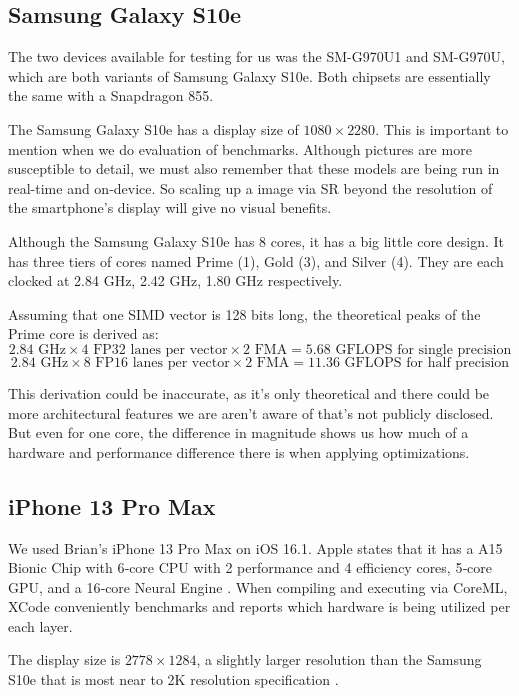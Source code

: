 \documentclass{article}
\begin{document}
\subsection{Samsung Galaxy S10e}
The two devices available for testing for us was the SM-G970U1 and SM-G970U, which are both variants of Samsung Galaxy S10e. Both chipsets are essentially the same with a Snapdragon 855.

The Samsung Galaxy S10e has a display size of $1080 \times 2280$. This is important to mention when we do evaluation of benchmarks. Although pictures are more susceptible to detail, we must also remember that these models are being run in real-time and on-device. So scaling up a image via SR beyond the resolution of the smartphone's display will give no visual benefits. 

Although the Samsung Galaxy S10e has 8 cores, it has a big little core design. It has three tiers of cores named Prime (1), Gold (3), and Silver (4). They are each clocked at 2.84 GHz, 2.42 GHz, 1.80 GHz respectively. 

Assuming that one SIMD vector is 128 bits long, the theoretical peaks of the Prime core is derived as:
$$2.84 \text{ GHz} \times 4 \text{ FP32 lanes per vector} \times 2 \text{ FMA} = 5.68 \text{ GFLOPS for single precision}$$
$$2.84 \text{ GHz} \times 8 \text{ FP16 lanes per vector} \times 2 \text{ FMA} = 11.36 \text{ GFLOPS for half precision}$$

This derivation could be inaccurate, as it's only theoretical and there could be more architectural features we are aren't aware of that's not publicly disclosed. But even for one core, the difference in magnitude shows us how much of a hardware and performance difference there is when applying optimizations.

\subsection{iPhone 13 Pro Max}
We used Brian's iPhone 13 Pro Max on iOS 16.1. Apple states that it has a A15 Bionic Chip with 6‑core CPU with 2 performance and 4 efficiency cores, 5‑core GPU, and a 16‑core Neural Engine \cite{iphone13promax}. When compiling and executing via CoreML, XCode conveniently benchmarks and reports which hardware is being utilized per each layer.

The display size is $2778 \times 1284$, a slightly larger resolution than the Samsung S10e that is most near to 2K resolution specification \cite{iphone13promax}.
\end{document}
